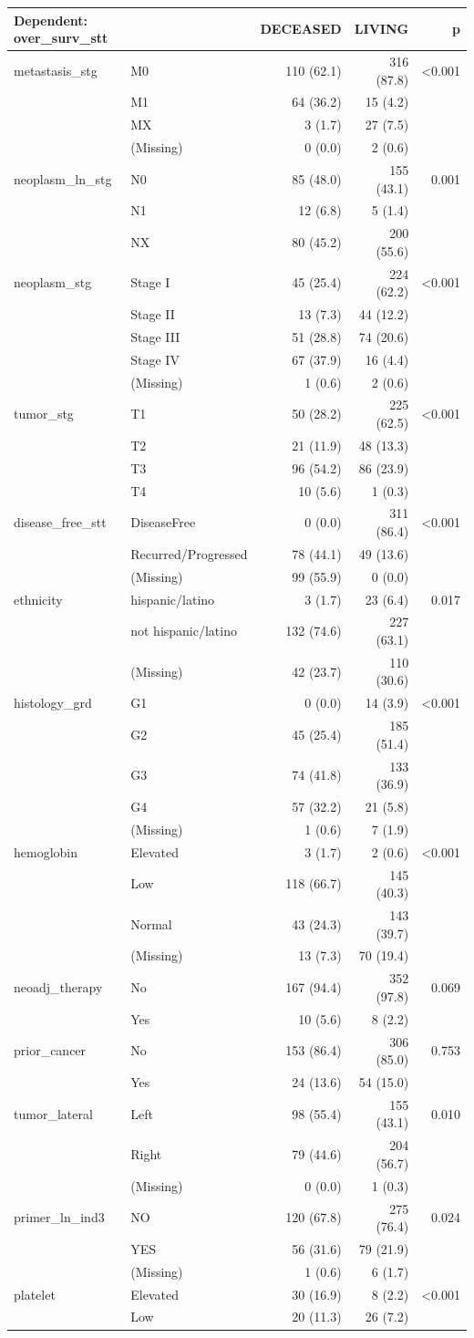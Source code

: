 \documentclass[]{article}
\begin{document}
\begin{longtable}[]{@{}llrrr@{}}
\toprule
Dependent: over\_surv\_stt & & DECEASED & LIVING & p\tabularnewline
\midrule
\endhead
metastasis\_stg & M0 & 110 (62.1) & 316 (87.8) &
\textless{}0.001\tabularnewline
& M1 & 64 (36.2) & 15 (4.2) &\tabularnewline
& MX & 3 (1.7) & 27 (7.5) &\tabularnewline
& (Missing) & 0 (0.0) & 2 (0.6) &\tabularnewline
neoplasm\_ln\_stg & N0 & 85 (48.0) & 155 (43.1) & 0.001\tabularnewline
& N1 & 12 (6.8) & 5 (1.4) &\tabularnewline
& NX & 80 (45.2) & 200 (55.6) &\tabularnewline
neoplasm\_stg & Stage I & 45 (25.4) & 224 (62.2) &
\textless{}0.001\tabularnewline
& Stage II & 13 (7.3) & 44 (12.2) &\tabularnewline
& Stage III & 51 (28.8) & 74 (20.6) &\tabularnewline
& Stage IV & 67 (37.9) & 16 (4.4) &\tabularnewline
& (Missing) & 1 (0.6) & 2 (0.6) &\tabularnewline
tumor\_stg & T1 & 50 (28.2) & 225 (62.5) &
\textless{}0.001\tabularnewline
& T2 & 21 (11.9) & 48 (13.3) &\tabularnewline
& T3 & 96 (54.2) & 86 (23.9) &\tabularnewline
& T4 & 10 (5.6) & 1 (0.3) &\tabularnewline
disease\_free\_stt & DiseaseFree & 0 (0.0) & 311 (86.4) &
\textless{}0.001\tabularnewline
& Recurred/Progressed & 78 (44.1) & 49 (13.6) &\tabularnewline
& (Missing) & 99 (55.9) & 0 (0.0) &\tabularnewline
ethnicity & hispanic/latino & 3 (1.7) & 23 (6.4) & 0.017\tabularnewline
& not hispanic/latino & 132 (74.6) & 227 (63.1) &\tabularnewline
& (Missing) & 42 (23.7) & 110 (30.6) &\tabularnewline
histology\_grd & G1 & 0 (0.0) & 14 (3.9) &
\textless{}0.001\tabularnewline
& G2 & 45 (25.4) & 185 (51.4) &\tabularnewline
& G3 & 74 (41.8) & 133 (36.9) &\tabularnewline
& G4 & 57 (32.2) & 21 (5.8) &\tabularnewline
& (Missing) & 1 (0.6) & 7 (1.9) &\tabularnewline
hemoglobin & Elevated & 3 (1.7) & 2 (0.6) &
\textless{}0.001\tabularnewline
& Low & 118 (66.7) & 145 (40.3) &\tabularnewline
& Normal & 43 (24.3) & 143 (39.7) &\tabularnewline
& (Missing) & 13 (7.3) & 70 (19.4) &\tabularnewline
neoadj\_therapy & No & 167 (94.4) & 352 (97.8) & 0.069\tabularnewline
& Yes & 10 (5.6) & 8 (2.2) &\tabularnewline
prior\_cancer & No & 153 (86.4) & 306 (85.0) & 0.753\tabularnewline
& Yes & 24 (13.6) & 54 (15.0) &\tabularnewline
tumor\_lateral & Left & 98 (55.4) & 155 (43.1) & 0.010\tabularnewline
& Right & 79 (44.6) & 204 (56.7) &\tabularnewline
& (Missing) & 0 (0.0) & 1 (0.3) &\tabularnewline
primer\_ln\_ind3 & NO & 120 (67.8) & 275 (76.4) & 0.024\tabularnewline
& YES & 56 (31.6) & 79 (21.9) &\tabularnewline
& (Missing) & 1 (0.6) & 6 (1.7) &\tabularnewline
platelet & Elevated & 30 (16.9) & 8 (2.2) &
\textless{}0.001\tabularnewline
& Low & 20 (11.3) & 26 (7.2) &\tabularnewline

\end{longtable}
\end{document}
